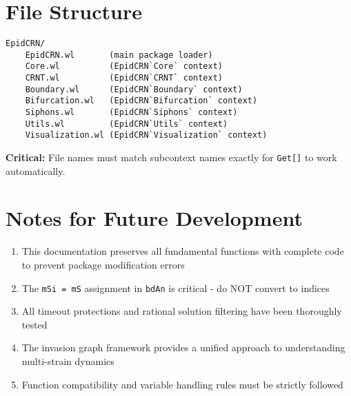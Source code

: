 \documentclass{article}
\begin{document}
\section{File Structure}

\begin{verbatim}
EpidCRN/
    EpidCRN.wl       (main package loader)
    Core.wl          (EpidCRN`Core` context)
    CRNT.wl          (EpidCRN`CRNT` context)
    Boundary.wl      (EpidCRN`Boundary` context)
    Bifurcation.wl   (EpidCRN`Bifurcation` context)
    Siphons.wl       (EpidCRN`Siphons` context)
    Utils.wl         (EpidCRN`Utils` context)
    Visualization.wl (EpidCRN`Visualization` context)
\end{verbatim}

\textbf{Critical:} File names must match subcontext names exactly for \texttt{Get[]} to work automatically.

\section{Notes for Future Development}

\begin{enumerate}
\item This documentation preserves all fundamental functions with complete code to prevent package modification errors
\item The \texttt{mSi = mS} assignment in \texttt{bdAn} is critical - do NOT convert to indices
\item All timeout protections and rational solution filtering have been thoroughly tested
\item The invasion graph framework provides a unified approach to understanding multi-strain dynamics
\item Function compatibility and variable handling rules must be strictly followed
\end{enumerate}
%
%
\end{document}
